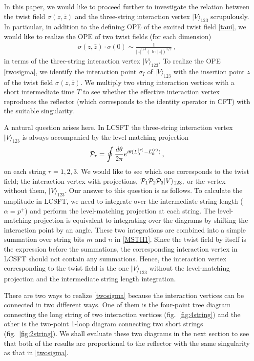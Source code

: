 \documentclass[12pt]{article}
\begin{document}
In this paper, we would like to proceed further to investigate the
relation between the twist field $\sigma(z,\bar z)$ and the
three-string interaction vertex $|V\rangle_{123}$ scrupulously.
In particular, in addition to the defining OPE of the excited twist
field \eqref{taui}, we would like to realize the OPE of two twist
fields  \cite{DFMSBR,OZ} (for each dimension)
\begin{align}
\sigma(z,\bar z)\cdot\sigma(0)
\sim\frac{1}{|z|^{1/4}(\ln |z|)^{1/2}}\,,
\label{twosigma}
\end{align}
in terms of the three-string interaction vertex $|V\rangle_{123}$.
To realize the OPE \eqref{twosigma}, we identify the interaction point
$\sigma_I$ of $|V\rangle_{123}$ with the insertion point $z$ of the
twist field $\sigma(z,\bar z)$.
We multiply two string interaction vertices with a short intermediate
time $T$ to see whether the effective interaction vertex reproduces
the reflector (which corresponds to the identity operator in CFT) with
the suitable singularity.

A natural question arises here. 
In LCSFT the three-string interaction vertex $|V\rangle_{123}$ is
always accompanied by the level-matching projection
\begin{align}
{\cal P}_r=\oint{d\theta\over 2\pi}
e^{i\theta(L_0^{(r)}-\bar{L}_0^{(r)})}\,,
\end{align}
on each string $r=1,2,3$.
We would like to see which one corresponds to the twist field; the
interaction vertex with projections,
${\cal P}_1{\cal P}_2{\cal P}_3|V\rangle_{123}$, or the vertex without
them, $|V\rangle_{123}$.
Our answer to this question is as follows.
To calculate the amplitude in LCSFT, we need to integrate over the
intermediate string length ($\alpha=p^+$) and perform the
level-matching projection at each string.
The level-matching projection is equivalent to integrating over the
diagrams by shifting the interaction point by an angle.
These two integrations are combined into a simple summation over
string bits $m$ and $n$ in \eqref{MSTH1}.
Since the twist field by itself is the expression before the
summations, the corresponding interaction vertex in LCSFT should not
contain any summations.
Hence, the interaction vertex corresponding to the twist field is the
one $|V\rangle_{123}$ without the level-matching projection and the
intermediate string length integration.

There are two ways to realize \eqref{twosigma} because the interaction
vertices can be connected in two different ways.
One of them is the four-point tree diagram connecting the long string
of two interaction vertices (fig.~\ref{fig:4string}) and the other
is the two-point 1-loop diagram connecting two short strings
(fig.~\ref{fig:2string}).
We shall evaluate these two diagrams in the next section to see that
both of the results are proportional to the reflector with the same
singularity as that in \eqref{twosigma}.
\end{document}
